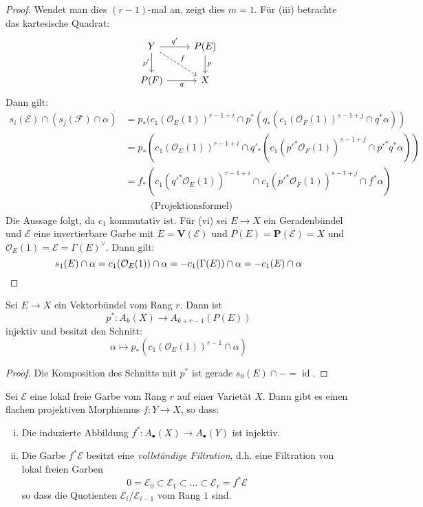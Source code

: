 \documentclass[10pt,a4paper]{article}
\begin{document}
\begin{proof}
Wendet man dies $(r-1)$-mal an, zeigt dies $m=1$. Für (iii) betrachte das kartesische Quadrat:
\[ \begin{tikzcd}
Y \rar["q'"]\dar["p'"']\ar[rd, "f", dashed] & P(E) \dar["p"]\\
P(F)\rar["q"'] & X
\end{tikzcd} \]
Dann gilt:
\begin{align*}
s_i(\mathcal{E})\cap (s_j(\mathcal{F})\cap \alpha) &= p_\ast (c_1(\mathcal{O}_E(1))^{r-1+i} \cap p^\ast(q_\ast(c_1(\mathcal{O}_F(1))^{s-1+j}\cap q^\ast \alpha))\\
&= p_\ast(c_1(\mathcal{O}_E(1))^{r-1+i}\cap q'_\ast(c_1(p'^\ast\mathcal{O}_F (1))^{s-1+j}\cap p'^\ast q^\ast\alpha))\\
&= f_\ast(c_1(q'^\ast\mathcal{O}_E(1))^{r-1+i}\cap c_1(p'^\ast\mathcal{O}_F (1))^{s-1+j}\cap f^\ast\alpha)\\
&\phantom{==} \text{(Projektionsformel)}
\end{align*}
Die Aussage folgt, da $c_1$ kommutativ ist. Für (vi) sei $E\to X$ ein Geradenbündel und $\mathcal{E}$ eine invertierbare Garbe mit $E=\mathbf{V}(\mathcal{E})$ und $P(E)=\mathbf{P}(\mathcal{E})=X$ und $\mathcal{O}_E(1)=\mathcal{E} = \Gamma(E)^\vee$. Dann gilt:
\[ s_1(E)\cap \alpha = c_1(\mathcal{O}_E(1))\cap\alpha = -c_1(\Gamma(E))\cap\alpha = -c_1(E)\cap\alpha\qedhere \]
\end{proof}

\begin{corollary}
Sei $E\to X$ ein Vektorbündel vom Rang $r$. Dann ist
\[ p^\ast: A_k(X)\to A_{k+r-1}(P(E)) \]
injektiv und besitzt den Schnitt:
\[ \alpha\mapsto p_\ast(c_1(\mathcal{O}_E(1))^{r-1}\cap\alpha) \]
\end{corollary}

\begin{proof}
Die Komposition des Schnitts mit $p^\ast$ ist gerade $s_0(E)\cap - = \operatorname{id}$.
\end{proof}

\begin{corollary}
Sei $\mathcal{E}$ eine lokal freie Garbe vom Rang $r$ auf einer Varietät $X$. Dann gibt es einen flachen projektiven Morphismus $f:Y\to X$, so dass:
\begin{enumerate}[(i)]
\item Die induzierte Abbildung $f^\ast:A_\bullet(X)\to A_\bullet(Y)$ ist injektiv.
\item Die Garbe $f^\ast\mathcal{E}$ besitzt eine \textit{vollständige Filtration}, d.h. eine Filtration von lokal freien Garben
\[ 0 = \mathcal{E}_0 \subset \mathcal{E}_1 \subset\ldots\subset \mathcal{E}_r = f^\ast\mathcal{E} \]
so dass die Quotienten $\mathcal{E}_i/\mathcal{E}_{i-1}$ vom Rang $1$ sind.
\end{enumerate}
\end{corollary}
\end{document}
